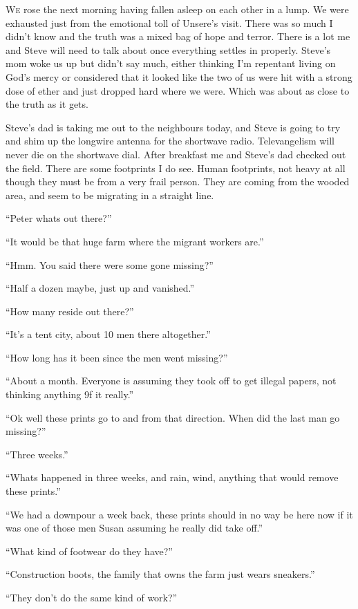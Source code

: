 \lettrine[lines=2,lraise=0]{W}e rose the next morning having fallen asleep on each other in a lump. We were exhausted just from the emotional toll of Unsere's visit. There was so much I didn't know and the truth was a mixed bag of hope and terror. There is a lot me and Steve will need to talk about once everything settles in properly. Steve's mom woke us up but didn't say much, either thinking I'm repentant living on God's mercy or considered that it looked like the two of us were hit with a strong dose of ether and just dropped hard where we were. Which was about as close to the truth as it gets.

Steve's dad is taking me out to the neighbours today, and Steve is going to try and shim up the longwire antenna for the shortwave radio. Televangelism will never die on the shortwave dial. After breakfast me and Steve's dad checked out the field. There are some footprints I do see. Human footprints, not heavy at all though they must be from a very frail person. They are coming from the wooded area, and seem to be migrating in a straight line.

``Peter whats out there?''

``It would be that huge farm where the migrant workers are.''

``Hmm. You said there were some gone missing?''

``Half a dozen maybe, just up and vanished.''

``How many reside out there?''

``It's a tent city, about 10 men there altogether.''

``How long has it been since the men went missing?''

``About a month. Everyone is assuming they took off to get illegal papers, not thinking anything 9f it really.''

``Ok well these prints go to and from that direction. When did the last man go missing?''

``Three weeks.''

``Whats happened in three weeks, and rain, wind, anything that would remove these prints.''

``We had a downpour a week back, these prints should in no way be here now if it was one of those men Susan assuming he really did take off.''

``What kind of footwear do they have?''

``Construction boots, the family that owns the farm just wears sneakers.''

``They don't do the same kind of work?''

